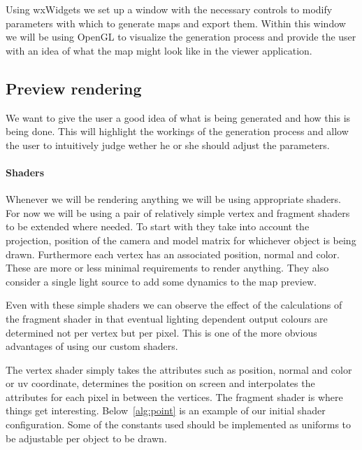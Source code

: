 Using wxWidgets we set up a window with the necessary controls to modify parameters with which to generate maps and export them. Within this window we will be using OpenGL to visualize the generation process and provide the user with an idea of what the map might look like in the viewer application.

\subsection{Preview rendering}

We want to give the user a good idea of what is being generated and how this is being done. This will highlight the workings of the generation process and allow the user to intuitively judge wether he or she should adjust the parameters.

\paragraph{Shaders}

Whenever we will be rendering anything we will be using appropriate shaders. For now we will be using a pair of relatively simple vertex and fragment shaders to be extended where needed. To start with they take into account the projection, position of the camera and model matrix for whichever object is being drawn. Furthermore each vertex has an associated position, normal and color. These are more or less minimal requirements to render anything. They also consider a single light source to add some dynamics to the map preview.

Even with these simple shaders we can observe the effect of the calculations of the fragment shader in that eventual lighting dependent output colours are determined not per vertex but per pixel. This is one of the more obvious advantages of using our custom shaders.

The vertex shader simply takes the attributes such as position, normal and color or uv coordinate, determines the position on screen and interpolates the attributes for each pixel in between the vertices. The fragment shader is where things get interesting. Below~\ref{alg:point} is an example of our initial shader configuration. Some of the constants used should be implemented as uniforms to be adjustable per object to be drawn.

